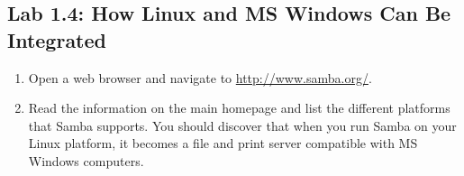 \subsection*{Lab 1.4: How Linux and MS Windows Can Be Integrated}

\begin{enumerate}
\item Open a web browser and navigate to {\url{http://www.samba.org/}}.
\item Read the information on the main homepage and list the different platforms that Samba supports. You should discover that when you run Samba on your Linux platform, it becomes a file and print server compatible with MS Windows computers. 

\vspace{1in} 
\end{enumerate}

